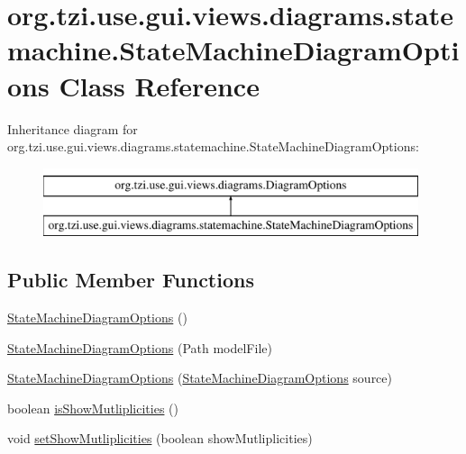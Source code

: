 \hypertarget{classorg_1_1tzi_1_1use_1_1gui_1_1views_1_1diagrams_1_1statemachine_1_1_state_machine_diagram_options}{\section{org.\-tzi.\-use.\-gui.\-views.\-diagrams.\-statemachine.\-State\-Machine\-Diagram\-Options Class Reference}
\label{classorg_1_1tzi_1_1use_1_1gui_1_1views_1_1diagrams_1_1statemachine_1_1_state_machine_diagram_options}
}
Inheritance diagram for org.\-tzi.\-use.\-gui.\-views.\-diagrams.\-statemachine.\-State\-Machine\-Diagram\-Options\-:\begin{figure}[H]
\begin{center}
\leavevmode
\includegraphics[height=2.000000cm]{classorg_1_1tzi_1_1use_1_1gui_1_1views_1_1diagrams_1_1statemachine_1_1_state_machine_diagram_options}
\end{center}
\end{figure}
\subsection*{Public Member Functions}
\begin{DoxyCompactItemize}
\item 
\hyperlink{classorg_1_1tzi_1_1use_1_1gui_1_1views_1_1diagrams_1_1statemachine_1_1_state_machine_diagram_options_a1223ba15b72176bb05d813d276875388}{State\-Machine\-Diagram\-Options} ()
\item 
\hyperlink{classorg_1_1tzi_1_1use_1_1gui_1_1views_1_1diagrams_1_1statemachine_1_1_state_machine_diagram_options_a1033fb3d4196bc422d40b2259997f7a3}{State\-Machine\-Diagram\-Options} (Path model\-File)
\item 
\hyperlink{classorg_1_1tzi_1_1use_1_1gui_1_1views_1_1diagrams_1_1statemachine_1_1_state_machine_diagram_options_a40d82ec9873123b787595dd87383c308}{State\-Machine\-Diagram\-Options} (\hyperlink{classorg_1_1tzi_1_1use_1_1gui_1_1views_1_1diagrams_1_1statemachine_1_1_state_machine_diagram_options}{State\-Machine\-Diagram\-Options} source)
\item 
boolean \hyperlink{classorg_1_1tzi_1_1use_1_1gui_1_1views_1_1diagrams_1_1statemachine_1_1_state_machine_diagram_options_a10e8f3a6c41083b0d266bbff111a4e54}{is\-Show\-Mutliplicities} ()
\item 
void \hyperlink{classorg_1_1tzi_1_1use_1_1gui_1_1views_1_1diagrams_1_1statemachine_1_1_state_machine_diagram_options_a84aa2aabcfd88e7960ea1d8033928821}{set\-Show\-Mutliplicities} (boolean show\-Mutliplicities)
\end{DoxyCompactItemize}
